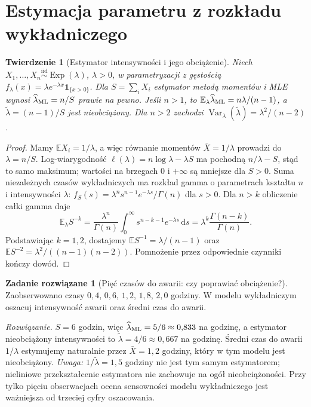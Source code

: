 \documentclass[11pt,a4paper,oneside]{report}
\numberwithin{equation}{chapter}
\theoremstyle{plain}
\newtheorem{twierdzenie}{Twierdzenie}[chapter]
\theoremstyle{definition}
\newtheorem{zadanie}{Zadanie rozwiązane}[chapter]
\theoremstyle{remark}
\newcommand{\E}{\mathbb E}
\newcommand{\Var}{\operatorname{Var}}
\newcommand{\ind}[1]{\mathbf 1_{#1}}
\newcommand{\dd}{\mathrm d}
\newcommand{\iid}{\mathrel{\overset{\mathrm{iid}}\sim}}
\begin{document}
\section{Estymacja parametru z rozkładu wykładniczego}
\begin{twierdzenie}[Estymator intensywności i jego obciążenie]
\label{thm:exp-rate}
Niech $X_1,\ldots,X_n\iid\operatorname{Exp}(\lambda)$,
$\lambda>0$, w parametryzacji z gęstością
$f_\lambda(x)=\lambda e^{-\lambda x}\ind{\{x>0\}}$.
Dla $S=\sum_iX_i$ estymator metodą momentów i MLE wynosi
$\widehat\lambda_{\rm ML}=n/S$ prawie na pewno.
Jeśli $n>1$, to $\E_\lambda\widehat\lambda_{\rm ML}
=n\lambda/(n-1)$, a $\widetilde\lambda=(n-1)/S$ jest
nieobciążony. Dla $n>2$ zachodzi
$\Var_\lambda(\widetilde\lambda)=\lambda^2/(n-2)$.
\end{twierdzenie}
\begin{proof}
Mamy $\E X_i=1/\lambda$, a więc równanie momentów
$\bar X=1/\lambda$ prowadzi do $\lambda=n/S$.
Log-wiarygodność $\ell(\lambda)=n\log\lambda-\lambda S$
ma pochodną $n/\lambda-S$, stąd to samo maksimum; wartości
na brzegach $0$ i $+\infty$ są mniejsze dla $S>0$.
Suma niezależnych czasów wykładniczych ma rozkład gamma o
parametrach kształtu $n$ i intensywności $\lambda$:
$f_S(s)=\lambda^n s^{n-1}e^{-\lambda s}/\Gamma(n)$ dla $s>0$.
Dla $n>k$ obliczenie całki gamma daje
\[
\E_\lambda S^{-k}
=\frac{\lambda^n}{\Gamma(n)}
 \int_0^\infty s^{n-k-1}e^{-\lambda s}\,\dd s
=\lambda^k\frac{\Gamma(n-k)}{\Gamma(n)}.
\]
Podstawiając $k=1,2$, dostajemy
$\E S^{-1}=\lambda/(n-1)$ oraz
$\E S^{-2}=\lambda^2/((n-1)(n-2))$.
Pomnożenie przez odpowiednie czynniki kończy dowód.
\end{proof}

\begin{zadanie}[Pięć czasów do awarii: czy poprawiać obciążenie?]
Zaobserwowano czasy $0{,}4$, $0{,}6$, $1{,}2$, $1{,}8$, $2{,}0$
godziny. W modelu wykładniczym oszacuj intensywność awarii
oraz średni czas do awarii.
\par\emph{Rozwiązanie.} $S=6$ godzin, więc
$\widehat\lambda_{\rm ML}=5/6\approx0{,}833$ na godzinę,
a estymator nieobciążony intensywności to
$\widetilde\lambda=4/6\approx0{,}667$ na godzinę.
Średni czas do awarii $1/\lambda$ estymujemy naturalnie przez
$\bar X=1{,}2$ godziny, który w tym modelu jest nieobciążony.
\emph{Uwaga:} $1/\widetilde\lambda=1{,}5$ godziny nie jest tym
samym estymatorem; nieliniowe przekształcenie estymatora
nie zachowuje na ogół nieobciążoności. Przy tylko pięciu
obserwacjach ocena sensowności modelu wykładniczego jest
ważniejsza od trzeciej cyfry oszacowania.
\end{zadanie}
\end{document}
